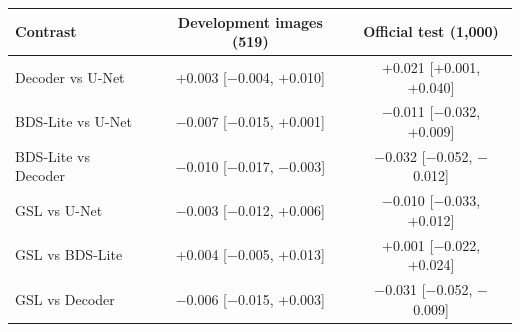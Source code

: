 \begin{tabular}{lcc}
\toprule
Contrast & Development images (519) & Official test (1,000) \\
\midrule
Decoder vs U-Net & +0.003 [$-$0.004, +0.010] & +0.021 [+0.001, +0.040] \\
BDS-Lite vs U-Net & $-$0.007 [$-$0.015, +0.001] & $-$0.011 [$-$0.032, +0.009] \\
BDS-Lite vs Decoder & $-$0.010 [$-$0.017, $-$0.003] & $-$0.032 [$-$0.052, $-$0.012] \\
GSL vs U-Net & $-$0.003 [$-$0.012, +0.006] & $-$0.010 [$-$0.033, +0.012] \\
GSL vs BDS-Lite & +0.004 [$-$0.005, +0.013] & +0.001 [$-$0.022, +0.024] \\
GSL vs Decoder & $-$0.006 [$-$0.015, +0.003] & $-$0.031 [$-$0.052, $-$0.009] \\
\bottomrule
\end{tabular}
